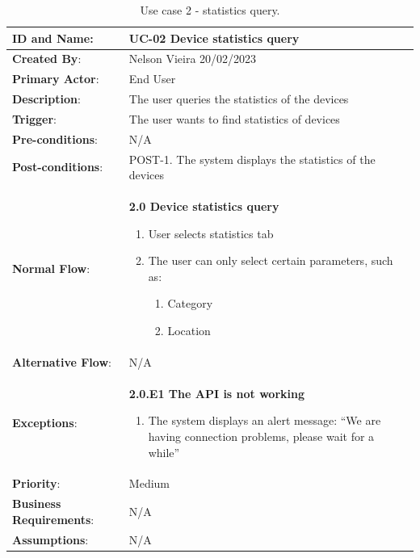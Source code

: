 \begin{table}[H]
    \centering
    \begin{adjustbox}{width=1.2\textwidth,center=\textwidth}
        \begin{tabular}{|m{4cm}|m{12cm}|}
            \hline
            \textbf{ID and Name}: & UC-02 Device statistics query \\
            \hline
            \textbf{Created By}: & Nelson Vieira 20/02/2023 \\
            \hline
            \textbf{Primary Actor}: & End User \\
            \hline
            \textbf{Description}: & The user queries the statistics of the devices \\
            \hline
            \textbf{Trigger}: & The user wants to find statistics of devices \\
            \hline
            \textbf{Pre-conditions}: & N/A \\
            \hline
            \textbf{Post-conditions}: & POST-1. The system displays the statistics of the devices \\
            \hline
            \textbf{Normal Flow}: & \textbf{2.0 Device statistics query}
            \begin{enumerate}
                \item User selects statistics tab
                \item The user can only select certain parameters, such as:
                \begin{enumerate}
                    \item Category
                    \item Location
                \end{enumerate}
            \end{enumerate} \\
            \hline
            \textbf{Alternative Flow}: & N/A \\
            \hline
            \textbf{Exceptions}: & \textbf{2.0.E1  The API is not working}
            \begin{enumerate}
                \item The system displays an alert message: ``We are having connection problems, please wait for a while''
            \end{enumerate} \\
            \hline
            \textbf{Priority}: & Medium \\
            \hline
            \textbf{Business Requirements}: & N/A \\
            \hline
            \textbf{Assumptions}: & N/A \\
            \hline
        \end{tabular}
    \end{adjustbox}
    \vspace{1em}
    \caption{Use case 2 - statistics query.}
    \label{table:use_case2}
\end{table}

